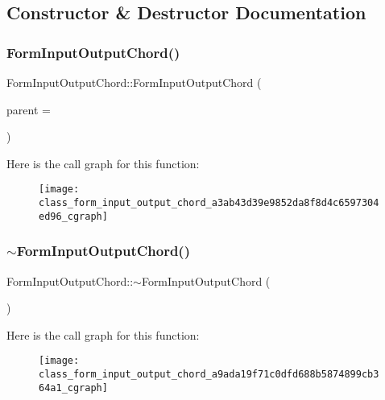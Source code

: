 \subsection{Constructor \& Destructor Documentation}
\mbox{\label{class_form_input_output_chord_a3ab43d39e9852da8f8d4c6597304ed96}} 
\subsubsection{Form\+Input\+Output\+Chord()}
{\footnotesize\ttfamily Form\+Input\+Output\+Chord\+::\+Form\+Input\+Output\+Chord (\begin{DoxyParamCaption}\item[{Q\+Widget $\ast$}]{parent = {} }\end{DoxyParamCaption})\hspace{0.3cm}{\ttfamily [explicit]}}

Here is the call graph for this function\+:\nopagebreak
\begin{figure}[H]
\begin{center}
\leavevmode
\texttt{[image: class\_form\_input\_output\_chord\_a3ab43d39e9852da8f8d4c6597304ed96\_cgraph]}
\end{center}
\end{figure}
\mbox{\label{class_form_input_output_chord_a9ada19f71c0dfd688b5874899cb364a1}} 
\subsubsection{$\sim$\+Form\+Input\+Output\+Chord()}
{\footnotesize\ttfamily Form\+Input\+Output\+Chord\+::$\sim$\+Form\+Input\+Output\+Chord (\begin{DoxyParamCaption}{ }\end{DoxyParamCaption})}

Here is the call graph for this function\+:\nopagebreak
\begin{figure}[H]
\begin{center}
\leavevmode
\texttt{[image: class\_form\_input\_output\_chord\_a9ada19f71c0dfd688b5874899cb364a1\_cgraph]}
\end{center}
\end{figure}


